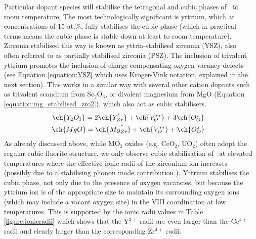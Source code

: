 Particular dopant species will stabilise the tetragonal and cubic phases of \zirconia\ to room temperature. The most technologically significant is yttrium, which at concentrations of 15 at.\%, fully stabilises the cubic phase (which in practical terms means the cubic phase is stable down at least to room temperature). Zirconia stabilised this way is known as yttria-stabilised zirconia (YSZ), also often referred to as partially stabilised zirconia (PSZ). The inclusion of trivalent yttrium promotes the inclusion of charge compensating oxygen vacancy defects (see Equation \ref{equation:YSZ} which uses Kr\"{o}ger-Vink notation, explained in the next section). This works in a similar way with several other cation dopants such as trivalent scandium from Sc$_{2}$O$_{3}$, or divalent magnesium from MgO (Equation \ref{equation:mg_stabilised_zro2}), which also act as cubic stabilisers.
\begin{gather}
\ch{Y_{2}O_{3}} = 2\ch{Y_{Zr}^{'}} + \ch{V_{O}^{**}} + 3\ch{O_{O}^{x}} \label{equation:YSZ} \\
\ch{MgO} = \ch{Mg_{Zr}^{''}} + \ch{V_{O}^{**}} + \ch{O_{O}^{x}} 
\label{equation:mg_stabilised_zro2}
\end{gather}
As already discussed above, while MO$_{2}$ oxides (e.g. CeO$_{2}$, UO$_{2}$) often adopt the regular cubic fluorite structure, we only observe cubic stabilisation  of \zirconia\ at elevated temperatures where the effective ionic radii of the zirconium ion increases (possibly due to a stabilising phonon mode contribution \cite{Mirgorodsky1999, Perry1990, Simeone2003, Harlow2018}). Yttrium stabilises the cubic phase, not only due to the presence of oxygen vacancies, but because the yttrium ion is of the appropriate size to maintain its surrounding oxygen ions (which may include a vacant oxygen site) in the VIII coordination at low temperatures. This is supported by the ionic radii values in Table \ref{figure:ionicradii} which shows that the Y$^{3+}$ radii are even larger than the Ce$^{4+}$ radii and clearly larger than the corresponding Zr$^{4+}$ radii. 



